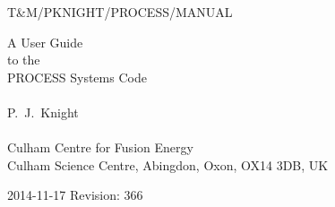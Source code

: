 \documentclass[11pt,a4paper]{report}
\newcommand{\version}{
2014-11-17
\hfill
Revision: 366
}
\begin{document}
\footnotesize
\hfill T\&M/PKNIGHT/PROCESS/MANUAL

\vspace*{4cm}
\begin{center}
\Huge A User Guide\\ to the \\ PROCESS Systems Code\\
~\\ \LARGE P.\ J.\ Knight\\
~\\ \Large Culham Centre for Fusion Energy\\
Culham Science Centre, Abingdon, Oxon, OX14 3DB, UK
\end{center}

\vfill
\footnotesize
\version
\normalsize

\tableofcontents

\listoffigures

\listoftables

%  
%  
%  
%  
%  
%  

\end{document}
